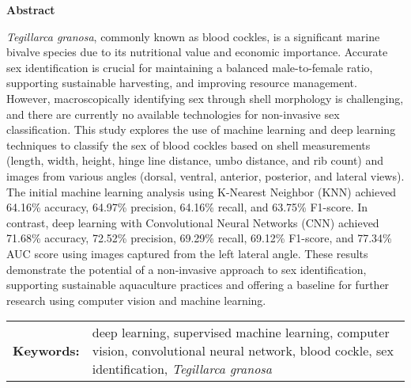 \begin{center}
	\textbf{Abstract}
\end{center}
\setlength{\parindent}{0pt}
\textit{Tegillarca granosa}, commonly known as blood cockles, is a significant marine bivalve species due to its nutritional value and economic importance. Accurate sex identification is crucial for maintaining a balanced male-to-female ratio, supporting sustainable harvesting, and improving resource management. However, macroscopically identifying sex through shell morphology is challenging, and there are currently no available technologies for non-invasive sex classification. This study explores the use of machine learning and deep learning techniques to classify the sex of blood cockles based on shell measurements (length, width, height, hinge line distance, umbo distance, and rib count) and images from various angles (dorsal, ventral, anterior, posterior, and lateral views). The initial machine learning analysis using K-Nearest Neighbor (KNN) achieved 64.16\% accuracy, 64.97\% precision, 64.16\% recall, and 63.75\% F1-score. In contrast, deep learning with Convolutional Neural Networks (CNN) achieved 71.68\% accuracy, 72.52\% precision, 69.29\% recall, 69.12\% F1-score, and 77.34\% AUC score using images captured from the left lateral angle. These results demonstrate the potential of a non-invasive approach to sex identification, supporting sustainable aquaculture practices and offering a baseline for further research using computer vision and machine learning.

\begin{tabular}{lp{4.25in}}
	\hspace{-0.5em}\textbf{Keywords:}\hspace{0.25em} & deep learning, supervised machine learning, computer vision, convolutional neural network, blood cockle, sex identification, \textit{Tegillarca granosa}\\
\end{tabular}
